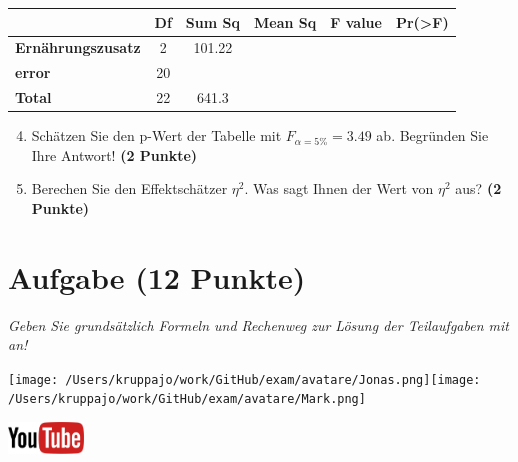 \documentclass[a4paper, 9pt]{scrartcl}\usepackage[]{graphicx}\usepackage[]{xcolor}
\begin{document}
\vspace{1Ex}

\begin{center}
  \Large
  \begin{tabular}{lccccp{3cm}}
\toprule
     & \textbf{Df} & \textbf{Sum Sq} & \textbf{Mean Sq} & \textbf{F value} & \textbf{Pr(>F)} \strut\\
    \midrule
   \textbf{Ernährungszusatz}  & 2 & 101.22 &  &  &  \strut\\
   \textbf{error}  & 20 &  &  &  &  \strut\\
   \textbf{Total}  & 22 & 641.3 &  &  &  \strut\\
\bottomrule
  \end{tabular}
\end{center}

\vspace{1Ex}

\begin{enumerate}
  \setcounter{enumi}{3}
\item Schätzen Sie den p-Wert der Tabelle mit $F_{\alpha = 5\%} = 3.49$ ab. Begründen Sie Ihre Antwort! \textbf{(2 Punkte)}
\item Berechen Sie den Effektschätzer $\eta^2$. Was sagt Ihnen der Wert von $\eta^2$ aus? \textbf{(2 Punkte)}
\end{enumerate}



 
\clearpage

\section{Aufgabe \hfill (12 Punkte)}

\textit{Geben Sie grundsätzlich Formeln und Rechenweg zur Lösung der Teilaufgaben mit an!} \\[1Ex]
 

 
\begin{minipage}[t]{0.5\textwidth}
\texttt{[image: /Users/kruppajo/work/GitHub/exam/avatare/Jonas.png]}\hspace{-4mm}\texttt{[image: /Users/kruppajo/work/GitHub/exam/avatare/Mark.png]}
\end{minipage}
\begin{minipage}[t]{0.5\textwidth}
\hfill
\href{https://youtu.be/49hvImMwVyE}{\includegraphics[width = 2cm]{img/youtube}}
\end{minipage}
\vspace{1ex}
\end{document}

